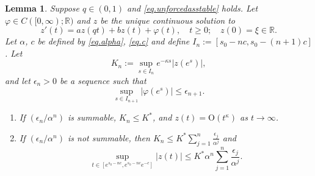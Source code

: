\documentclass[a4paper,10pt,reqno]{amsart}
\numberwithin{equation}{section}
\newtheorem{lemma}{Lemma}
\theoremstyle{definition}
\theoremstyle{remark}
\DeclareMathOperator{\1}{\mathbbm 1}
\begin{document}
	\begin{lemma} \label{lemma.fundamental}
		Suppose $q\in (0,1)$ and \eqref{eq.unforcedasstable} holds. Let $\varphi\in C([0,\infty);\mathbb{R})$ and $z$ be the unique continuous solution to 
		\begin{equation} \label{eq.z}
			z'(t)=az(qt)+bz(t)+\varphi(t),\quad t\geq 0; \quad z(0)=\xi\in\mathbb{R}.
		\end{equation}
		Let $\alpha$, $c$ be defined by \eqref{eq.alpha}, \eqref{eq.c} and define $I_n:=[s_0-nc,s_0-(n+1)c]$. Let  
		\begin{equation} \label{eq.Kn}
			K_n:=\sup_{s\in I_n} e^{-\kappa s}|z(e^s)|,
		\end{equation}
		and let $\epsilon_n>0$ be a sequence such that  
		\begin{equation} \label{eq.epsn}
			\sup_{s\in I_{n+1}} |\varphi(e^s)|\leq \epsilon_{n+1}.
		\end{equation}
		\begin{enumerate}
			\item[(i)] If $(\epsilon_n/\alpha^n)$ is summable, $K_n\leq K^\ast$, and  $z(t) = \text{O}(t^\kappa)$ as $t\to\infty$.  
			\item[(ii)] If $(\epsilon_n/\alpha^n)$ is not summable, then $
			K_n\leq K^\ast \sum_{j=1}^n \frac{\epsilon_j}{\alpha^j}$
			and 
			\begin{equation} \label{eq.fundest2}
				\sup_{t\in [e^{s_0-nc},e^{s_0-nc}e^{-c}]} |z(t)|\leq K^\ast  \alpha^n \sum_{j=1}^n \frac{\epsilon_j}{\alpha^j}.
			\end{equation}
		\end{enumerate}
	\end{lemma}
	
\end{document}
